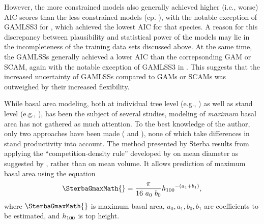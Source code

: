 However, the more constrained models also generally achieved higher (i.e., worse) AIC scores than the less constrained models (cp. ), with the notable exception of GAMLSS3 for \Spruce{}, which achieved the lowest AIC for that species.  A reason for this discrepancy between plausibility and statistical power of the models may lie in the incompleteness of the training data sets discussed above.  At the same time, the GAMLSSs generally achieved a lower AIC than the correpsonding GAM or SCAM, again with the notable exception of GAMLSS3 in \Spruce{}.  This suggests that the increased uncertainty of GAMLSSs compared to GAMs or SCAMs was outweighed by their increased flexibility.

While basal area modeling, both at individual tree level (e.g., \textcite{Andreassen2003,Hein2006,Jogiste2000,Monserud1996,Nystroem1997,Schroeder2002,Wimberly1996}) as well as stand level (e.g., \textcite{Castedo-Dorado2007,Chikumbo2001,Chikumbo1999,Eerikaeinen2003}), has been the subject of several studies, modeling of \emph{maximum} basal area has not gathered as much attention.  To the best knowledge of the author, only two approaches have been made (\textcite{Sterba1975,Sterba1987,Sterba1981} and \textcite{Woerdehoff2016}), none of which take differences in stand productivity into account.
The method presented by Sterba results from applying the “competition-density rule” developed by \textcite{Kira1953,Ando1968,Ando1968a,Tadaki1963} on mean diameter as suggested by \textcite{Goulding1972}, rather than on mean volume.  It allows prediction of maximum basal area using the equation
\begin{equation}
  \label{eq:SterbaGmax}
  \SterbaGmaxMath{} = \frac{\pi}{16~a_0~b_0} \TopHeightMath{} ^ {-(a_1 + b_1)},
\end{equation}
where \(\SterbaGmaxMath{}\) is maximum basal area, \(a_0, a_1, b_0, b_1\) are coefficients to be estimated, and \(h_{100}{}\) is top height.
